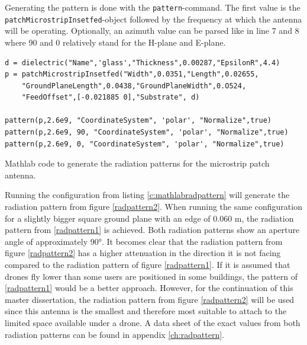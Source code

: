 Generating the pattern is done with the \verb|pattern|-command. The first value is the \\ \verb|patchMicrostripInsetfed|-object followed by the frequency
at which the antenna will be operating. Optionally, an azimuth value can be parsed like in line 7 and 8 where 90 and 0 relatively stand for the H-plane and E-plane.

\begin{listing}[h!]
\begin{verbatim}
d = dielectric("Name",'glass',"Thickness",0.00287,"EpsilonR",4.4)
p = patchMicrostripInsetfed("Width",0.0351,"Length",0.02655,
    "GroundPlaneLength",0.0438,"GroundPlaneWidth",0.O524,
    "FeedOffset",[-0.021885 0],"Substrate", d)

pattern(p,2.6e9, "CoordinateSystem", 'polar', "Normalize",true)
pattern(p,2.6e9, 90, "CoordinateSystem", 'polar', "Normalize",true)
pattern(p,2.6e9, 0, "CoordinateSystem", 'polar', "Normalize",true)
\end{verbatim}
\caption{Mathlab code to generate the radiation patterns for the microstrip patch antenna.}
\label{c:mathlabradpattern}
\end{listing}

Running the configuration from listing \ref{c:mathlabradpattern} will generate the radiation pattern from figure \ref{radpattern2}.
When running the same configuration for a slightly bigger square ground plane with an edge of 0.060 m, the radiation pattern from \ref{radpattern1} is
achieved. Both radiation patterns show an aperture angle of approximately 90°. It becomes clear that the radiation pattern from figure \ref{radpattern2} has a higher attenuation in the direction it is not facing compared to
the radiation pattern of figure \ref{radpattern1}. If it is assumed that drones fly lower than some users are positioned in some buildings, the pattern of 
\ref{radpattern1} would be a better approach. However, for the continuation of this master dissertation, the radiation pattern from figure \ref{radpattern2} 
will be used since this antenna is the smallest
and therefore most suitable to attach to the limited space available under a drone.  A data sheet of the exact values from both radiation patterns can be
found in appendix \ref{ch:radpattern}.

